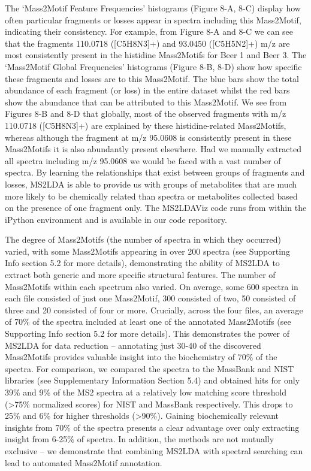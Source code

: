 The ‘Mass2Motif Feature Frequencies’ histograms (Figure 8-A, 8-C) display how often particular fragments or losses appear in spectra including this Mass2Motif, indicating their consistency. For example, from Figure 8-A and 8-C we can see that the fragments 110.0718 ([C5H8N3]+) and 93.0450 ([C5H5N2]+) m/z are most consistently present in the histidine Mass2Motifs for Beer 1 and Beer 3. The ‘Mass2Motif Global Frequencies’ histograms (Figure 8-B, 8-D) show how specific these fragments and losses are to this Mass2Motif. The blue bars show the total abundance of each fragment (or loss) in the entire dataset whilst the red bars show the abundance that can be attributed to this Mass2Motif. We see from Figures 8-B and 8-D that globally, most of the observed fragments with m/z 110.0718 ([C5H8N3]+) are explained by these histidine-related Mass2Motifs, whereas although the fragment at m/z 95.0608 is consistently present in these Mass2Motifs it is also abundantly present elsewhere. Had we manually extracted all spectra including m/z 95.0608 we would be faced with a vast number of spectra. By learning the relationships that exist between groups of fragments and losses, MS2LDA is able to provide us with groups of metabolites that are much more likely to be chemically related than spectra or metabolites collected based on the presence of one fragment only. The MS2LDAViz code runs from within the iPython environment and is available in our code repository.

The degree of Mass2Motifs (the number of spectra in which they occurred) varied, with some Mass2Motifs appearing in over 200 spectra (see Supporting Info section 5.2 for more details), demonstrating the ability of MS2LDA to extract both generic and more specific structural features. The number of Mass2Motifs within each spectrum also varied. On average, some 600 spectra in each file consisted of just one Mass2Motif, 300 consisted of two, 50 consisted of three and 20 consisted of four or more. Crucially, across the four files, an average of 70\% of the spectra included at least one of the annotated Mass2Motifs (see Supporting Info section 5.2 for more details). This demonstrates the power of MS2LDA for data reduction – annotating just 30-40 of the discovered Mass2Motifs provides valuable insight into the biochemistry of 70\% of the spectra. For comparison, we compared the spectra to the MassBank and NIST libraries (see Supplementary Information Section 5.4) and obtained hits for only 39\% and 9\% of the MS2 spectra at a relatively low matching score threshold (>75\% normalized scores) for NIST and MassBank respectively. This drops to 25\% and 6\% for higher thresholds (>90\%). Gaining biochemically relevant insights from 70\% of the spectra presents a clear advantage over only extracting insight from 6-25\% of spectra. In addition, the methods are not mutually exclusive – we demonstrate that combining MS2LDA with spectral searching can lead to automated Mass2Motif annotation.

